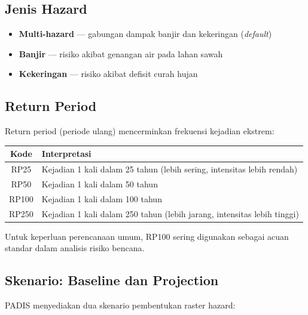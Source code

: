 \documentclass[12pt, a4paper]{article}
\begin{document}
  \subsection{Jenis Hazard}

  \begin{itemize}
    \item \textbf{Multi-hazard} — gabungan dampak banjir dan kekeringan (\textit{default})
    \item \textbf{Banjir} — risiko akibat genangan air pada lahan sawah
    \item \textbf{Kekeringan} — risiko akibat defisit curah hujan
  \end{itemize}

  \subsection{Return Period}

  Return period (periode ulang) mencerminkan frekuensi kejadian ekstrem:

  \begin{center}
  \begin{tabularx}{0.75\textwidth}{@{} c X @{}}
    \toprule
    \textbf{Kode} & \textbf{Interpretasi} \\
    \midrule
    RP25  & Kejadian 1 kali dalam 25 tahun (lebih sering, intensitas lebih rendah) \\
    RP50  & Kejadian 1 kali dalam 50 tahun \\
    RP100 & Kejadian 1 kali dalam 100 tahun \\
    RP250 & Kejadian 1 kali dalam 250 tahun (lebih jarang, intensitas lebih tinggi) \\
    \bottomrule
  \end{tabularx}
  \end{center}

  \begin{tipbox}
    Untuk keperluan perencanaan umum, RP100 sering digunakan sebagai acuan standar
    dalam analisis risiko bencana.
  \end{tipbox}

  \subsection{Skenario: Baseline dan Projection}

  PADIS menyediakan dua skenario pembentukan raster hazard:
\end{document}
